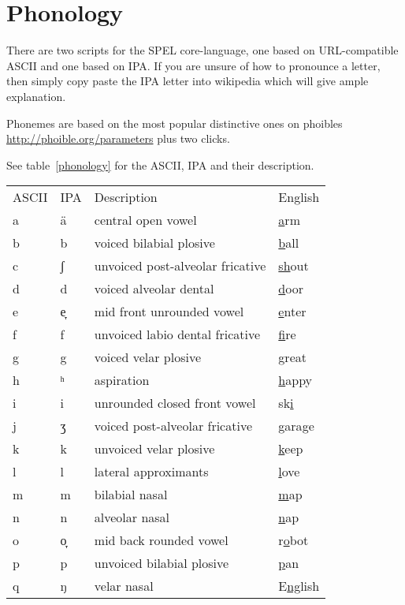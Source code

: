 \chapter{Phonology}

There are two scripts for the SPEL core-language,
one based on URL-compatible ASCII and one based on IPA\@.
If you are unsure of how to pronounce a letter, then simply copy
paste the IPA letter into wikipedia which will give ample
explanation.

Phonemes are based on the most popular distinctive ones on phoibles
\url{http://phoible.org/parameters} plus two clicks.

See table~\ref{phonology} for the ASCII, IPA and their description.


\begin{table}
\begin{tabular}{llll}
ASCII&IPA&Description&English\\
a & {\uni{} ä} & central open vowel &\underline{a}rm\\
b & {\uni{} b} & voiced bilabial plosive &\underline{b}all\\
c & {\uni{} ʃ} & unvoiced post-alveolar fricative & \underline{sh}out\\
d & {\uni{} d} & voiced alveolar dental&\underline{d}oor\\
e & {\uni{} e̞} & mid front unrounded vowel&\underline{e}nter\\
f & {\uni{} f} & unvoiced labio dental fricative&\underline{f}ire\\
g & {\uni{} g} & voiced velar plosive&\underline{g}reat\\
h & {\uni{} ʰ} & aspiration&\underline{h}appy\\
i & {\uni{} i} & unrounded closed front vowel&sk\underline{i}\\
j & {\uni{} ʒ} & voiced post-alveolar fricative&gara\underline{g}e\\
k & {\uni{} k} & unvoiced velar plosive&\underline{k}eep\\
l & {\uni{} l} & lateral approximants&\underline{l}ove\\
m & {\uni{} m} & bilabial nasal&\underline{m}ap\\
n & {\uni{} n} & alveolar nasal&\underline{n}ap\\
o & {\uni{} o̞} & mid back rounded vowel&r\underline{o}bot\\
p & {\uni{} p} & unvoiced bilabial plosive&\underline{p}an\\
q & {\uni{} ŋ} & velar nasal&E\underline{ng}lish\\

\end{tabular}
\end{table}

